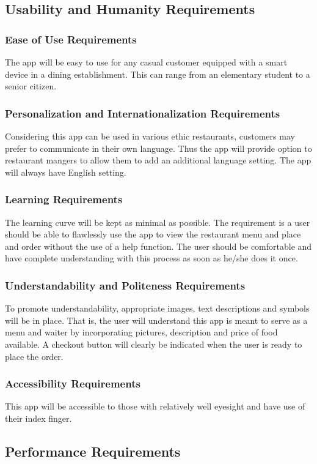 \documentclass[12pt, titlepage]{article}
\begin{document}
\subsection{Usability and Humanity Requirements}
\subsubsection{Ease of Use Requirements}
 The app will be easy to use for any casual customer equipped with a smart device in a dining establishment. This can range from an elementary student to a senior citizen.  
\subsubsection{Personalization and Internationalization Requirements}
Considering this app can be used in various ethic restaurants, customers may prefer to communicate in their own language. Thus the app will provide option to restaurant mangers to allow them to add an additional language setting. The app will always have English setting.
\subsubsection{Learning Requirements}
The learning curve will be kept as minimal as possible. The requirement is a user should be able to flawlessly use the app to view the restaurant menu and place and order without the use of a help function. The user should be comfortable and have complete understanding with this process as soon as he/she does it once.
\subsubsection{Understandability and Politeness Requirements}
To promote understandability, appropriate images, text descriptions and symbols will be in place. That is, the user will understand this app is meant to serve as a menu and waiter by incorporating pictures, description and price of food available. A checkout button will clearly be indicated when the user is ready to place the order.
\subsubsection{Accessibility Requirements}
This app will be accessible to those with relatively well eyesight and have use of their index finger. 
 
\subsection{Performance Requirements}
\end{document}
